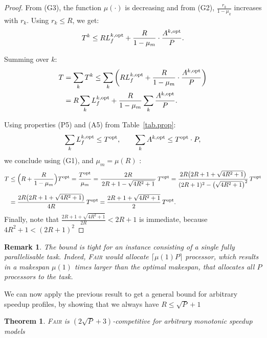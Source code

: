 \documentclass{article}
\newtheorem{remark}{Remark}
\newtheorem{theorem}{Theorem}
\newcommand\fair{\textsc{Fair}\xspace}
\newcommand\ratio{R\xspace}
\newcommand\rratio{r\xspace}
\newcommand\opt{\textnormal{opt}\xspace}
\begin{document}
\begin{proof}
From (G3), the function $\mu(\cdot)$ is decreasing and from (G2), $\frac{\rratio_k}{1 - \mu_k}$ increases with $\rratio_k$. Using $\rratio_k \leq \ratio$, we get:
\[
T^k \leq \ratio L_f^{k,\opt} + \frac{\ratio}{1 - \mu_m} \cdot \frac{A^{k,\opt}}{P}.
\]

Summing over $k$:
\begin{align*}
T &= \sum_k T^k
\leq \sum_k \left( \ratio L_f^{k,\opt} + \frac{\ratio}{1 - \mu_m} \cdot \frac{A^{k,\opt}}{P} \right) \\
&= \ratio \sum_k L_f^{k,\opt} + \frac{\ratio}{1 - \mu_m} \sum_k \frac{A^{k,\opt}}{P}.
\end{align*}

Using properties (P5) and (A5) from Table~\ref{tab.prop}:
\[
\sum_k L_f^{k,\opt} \leq T^{\opt}, \qquad \sum_k A^{k,\opt} \leq T^{\opt} \cdot P,
\]
we conclude using (G1), and $\mu_m=\mu(\ratio)$ :
\[
\begin{aligned}
T 
&\le \Bigl(\ratio + \frac{\ratio}{1-\mu_m}\Bigr) T^{\opt}  = \frac{T^{\opt}}{\mu_m}= \frac{2\ratio}{\,2\ratio + 1 - \sqrt{4\ratio^{2}+1}\,}\,T^{\opt}= \frac{2\ratio\bigl(2\ratio + 1 + \sqrt{4\ratio^{2}+1}\bigr)}
        {(2\ratio + 1)^{2}-\bigl(\sqrt{4\ratio^{2}+1}\bigr)^{2}}\,T^{\opt}\\[4pt]
&= \frac{2\ratio\bigl(2\ratio + 1 + \sqrt{4\ratio^{2}+1}\bigr)}
        {4\ratio}\,T^{\opt} = \frac{2\ratio + 1 + \sqrt{4\ratio^{2}+1}}{2}\,T^{\opt}.
\end{aligned}
\]
Finally, note that $\frac{2\ratio+1+\sqrt{4\ratio^2+1}}{2\ratio}<2\ratio+1$ is immediate, because $4\ratio^2+1<(2\ratio+1)^2$
\end{proof}

\begin{remark}
The bound is tight for an instance consisting of a single fully parallelisable task. Indeed, \fair would allocate $\lceil \mu(1)P \rceil$ processor, which results in a makespan $\mu(1)$ times larger than the optimal makespan, that allocates all $P$ processors to the task.
\end{remark}

We can now apply the previous result to get a general bound for arbitrary speedup profiles, by showing that we always have $\ratio \leq \sqrt{P}+1$

\begin{theorem}
\fair is $(2\sqrt{P}+3)$-competitive for arbitrary monotonic speedup models
\end{theorem}
\end{document}
